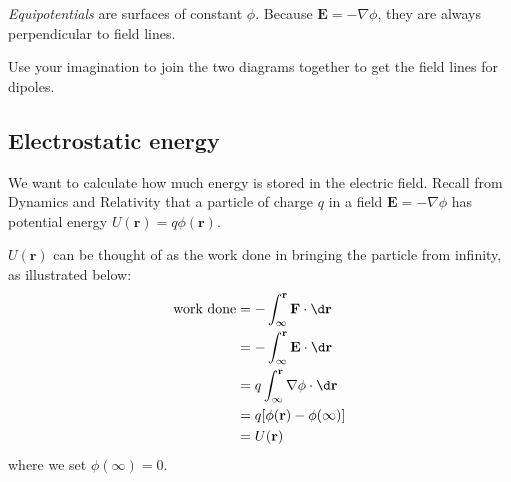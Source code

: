 \documentclass[a4paper]{article}
\begin{document}
\begin{defi}[Equipotentials]
  \emph{Equipotentials} are surfaces of constant $\phi$. Because $\mathbf{E} = -\nabla \phi$, they are always perpendicular to field lines.
\end{defi}
\begin{eg}\leavevmode
  \begin{center}
  \end{center}
  Use your imagination to join the two diagrams together to get the field lines for dipoles.
\end{eg}

\subsection{Electrostatic energy}
We want to calculate how much energy is stored in the electric field. Recall from Dynamics and Relativity that a particle of charge $q$ in a field $\mathbf{E} = -\nabla \phi$ has potential energy $U(\mathbf{r}) = q\phi(\mathbf{r})$.

$U(\mathbf{r})$ can be thought of as the work done in bringing the particle from infinity, as illustrated below:
\begin{align*}
  \text{work done} &= -\int_\infty^\mathbf{r} \mathbf{F}\cdot \d \mathbf{r}\\
  &= -\int_\infty^\mathbf{r}\mathbf{E}\cdot \d \mathbf{r} \\
  &= q\int_\infty^\mathbf{r} \nabla \mathbf{\phi}\cdot \d \mathbf{r}\\
  &= q[\phi(\mathbf{r}) - \phi(\infty)]\\
  &= U(\mathbf{r})
\end{align*}
where we set $\phi(\infty) = 0$.
\end{document}
